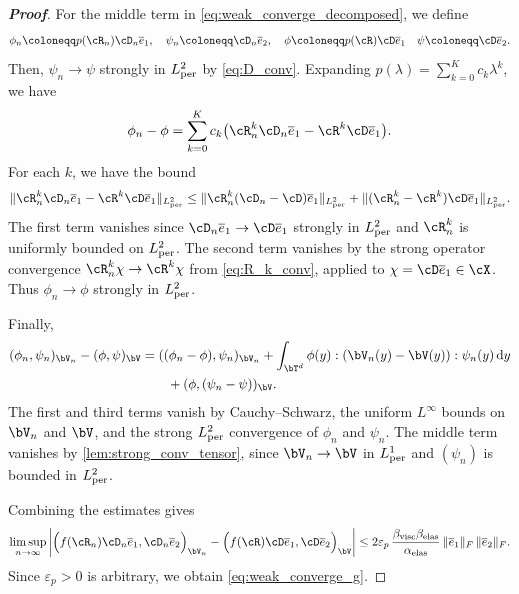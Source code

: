 \begin{proof}[\bf Proof]
For the middle term in \cref{eq:weak_converge_decomposed}, we define
\begin{align*}
    \phi_n\coloneqq p(\cR_n)\cD_n\overline e_1,\quad \psi_n\coloneqq \cD_n\overline e_2,\quad\phi\coloneqq p(\cR)\cD\overline e_1\quad \psi\coloneqq \cD\overline e_2.
\end{align*}
Then, $\psi_n\to\psi$ strongly in $L^2_{\rm per}$ by \cref{eq:D_conv}. Expanding $p(\lambda)=\sum_{k=0}^K c_k\lambda^k$, we have
\begin{equation*}
\phi_n-\phi=\sum_{k=0}^K c_k\bigl(\cR_n^k\cD_n\overline e_1-\cR^k\cD\overline e_1\bigr).
\end{equation*}
For each $k$, we have the bound
\begin{equation*}
\|\cR_n^k\cD_n\overline e_1-\cR^k\cD\overline e_1\|_{L^2_{\rm per}}
\le \|\cR_n^k(\cD_n-\cD)\overline e_1\|_{L^2_{\rm per}}+\|(\cR_n^k-\cR^k)\cD\overline e_1\|_{L^2_{\rm per}}.
\end{equation*}
The first term vanishes since $\cD_n\overline e_1\to \cD\overline e_1$ strongly in $L^2_{\rm per}$ and $\cR_n^k$ is uniformly bounded on $L^2_{\rm per}$. The second term vanishes by the strong operator convergence $\cR_n^k\chi\to \cR^k\chi$ from \cref{eq:R_k_conv}, applied to $\chi=\cD\overline e_1\in\cX$. Thus $\phi_n\to\phi$ strongly in $L^2_{\rm per}$.

Finally,
\begin{align*}
    (\phi_n,\psi_n)_{\bV_n}-(\phi,\psi)_{\bV}
    &=((\phi_n-\phi),\psi_n)_{\bV_n}+\int_{\bT^d}\phi(y):(\bV_n(y)-\bV(y)):\psi_n(y)\,\mathrm{d}y\\
    &\qquad +(\phi,(\psi_n-\psi))_{\bV}.
\end{align*}
The first and third terms vanish by Cauchy--Schwarz, the uniform $L^\infty$ bounds on $\bV_n$ and $\bV$, and the strong $L^2_{\rm per}$ convergence of $\phi_n$ and $\psi_n$. The middle term vanishes by \cref{lem:strong_conv_tensor}, since $\bV_n\to\bV$ in $L^1_{\rm per}$ and $(\psi_n)$ is bounded in $L^2_{\rm per}$.

Combining the estimates gives
\begin{equation*}
\limsup_{n\to\infty}\left|\Bigl(f(\cR_n)\cD_n\overline e_1,\cD_n\overline e_2\Bigr)_{\bV_n}-\Bigl(f(\cR)\cD\overline e_1,\cD\overline e_2\Bigr)_{\bV}\right|
\le 2\varepsilon_p\,\frac{\beta_{\rm visc}\beta_{\rm elas}}{\alpha_{\rm elas}}\,\|\overline e_1\|_F\,\|\overline e_2\|_F.
\end{equation*}
Since $\varepsilon_p>0$ is arbitrary, we obtain \cref{eq:weak_converge_g}.
\end{proof}

